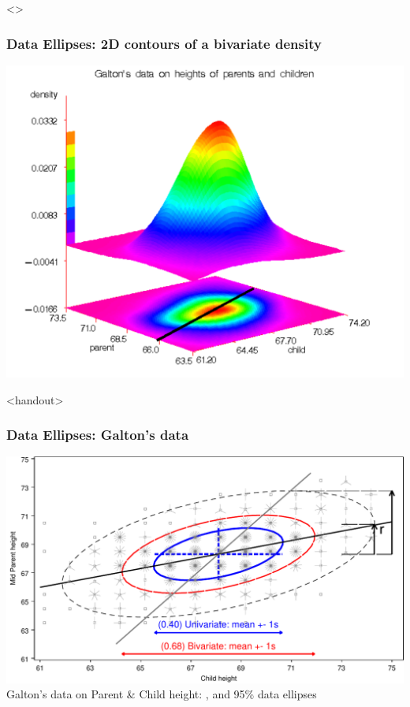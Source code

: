 \renewcommand{\FileName}{dataellipse3}

\begin{frame}<\inlong>
  \frametitle{Data Ellipses: 2D contours of a bivariate density}
 \begin{center}
  \includegraphics[height=.8\textheight,clip]{fig/galton-kdes}
 \end{center}
\end{frame}

\begin{frame}<handout>
  \frametitle{Data Ellipses: Galton's data}
  \begin{center}
  \includegraphics[width=.9\textwidth,clip]{fig/galton-reg3}
  \\ Galton's data on Parent \& Child height: ,  and 95\% data ellipses
  \end{center}
\end{frame}

